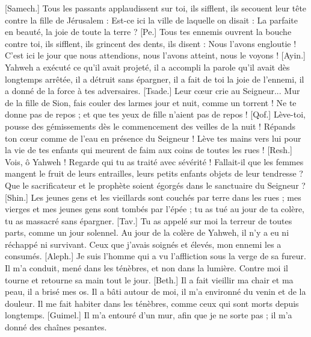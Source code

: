 \begin{multicols}{2}
[Samech.] Tous les passants applaudissent sur toi, ils sifflent, ils secouent leur tête contre la fille de Jérusalem : Est-ce ici la ville de laquelle on disait : La parfaite en beauté, la joie de toute la terre ?
[Pe.] Tous tes ennemis ouvrent la bouche contre toi, ils sifflent, ils grincent des dents, ils disent : Nous l'avons engloutie ! C’est ici le jour que nous attendions, nous l’avons atteint, nous le voyons !
[Ayin.] Yahweh a exécuté ce qu’il avait projeté, il a accompli la parole qu’il avait dès longtemps arrêtée, il a détruit sans épargner, il a fait de toi la joie de l'ennemi, il a donné de la force à tes adversaires.
[Tsade.] Leur cœur crie au Seigneur... Mur de la fille de Sion, fais couler des larmes jour et nuit, comme un torrent ! Ne te donne pas de repos ; et que tes yeux de fille n’aient pas de repos  !
[Qof.] Lève-toi, pousse des gémissements dès le commencement des veilles de la nuit ! Répands ton cœur comme de l’eau en présence du Seigneur ! Lève tes mains vers lui pour la vie de tes enfants qui meurent de faim aux coins de toutes les rues !
[Resh.] Vois, ô Yahweh ! Regarde qui tu as traité avec sévérité ! Fallait-il que les femmes mangent le fruit de leurs entrailles, leurs petits enfants objets de leur tendresse ? Que le sacrificateur et le prophète soient égorgés dans le sanctuaire du Seigneur ?
[Shin.] Les jeunes gens et les vieillards sont couchés par terre dans les rues ; mes vierges et mes jeunes gens sont tombés par l’épée ; tu as tué au jour de ta colère, tu as massacré sans épargner.
[Tav.] Tu as appelé sur moi la terreur de toutes parts, comme un jour solennel. Au jour de la colère de Yahweh, il n'y a eu ni réchappé ni survivant. Ceux que j’avais soignés et élevés, mon ennemi les a consumés.
\VerseOne{}[Aleph.] Je suis l’homme qui a vu l’affliction sous la verge de sa fureur.
Il m’a conduit, mené dans les ténèbres, et non dans la lumière.
Contre moi il tourne et retourne sa main tout le jour.
[Beth.] Il a fait vieillir ma chair et ma peau, il a brisé mes os.
Il a bâti autour de moi, il m’a environné du venin et de la douleur.
Il me fait habiter dans les ténèbres, comme ceux qui sont morts depuis longtemps.
[Guimel.] Il m'a entouré d'un mur, afin que je ne sorte pas ; il m'a donné des chaînes pesantes.

\end{multicols}
